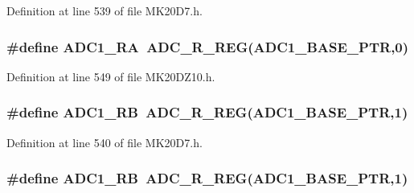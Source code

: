 Definition at line 539 of file M\+K20\+D7.\+h.

\subsubsection[{\texorpdfstring{A\+D\+C1\+\_\+\+RA}{ADC1_RA}}]{\setlength{\rightskip}{0pt plus 5cm}\#define A\+D\+C1\+\_\+\+RA~{\bf A\+D\+C\+\_\+\+R\+\_\+\+R\+EG}({\bf A\+D\+C1\+\_\+\+B\+A\+S\+E\+\_\+\+P\+TR},0)}\hypertarget{group___a_d_c___register___accessor___macros_ga1aaa28f242f4a1cfb93cceadfec24aba}{}\label{group___a_d_c___register___accessor___macros_ga1aaa28f242f4a1cfb93cceadfec24aba}


Definition at line 549 of file M\+K20\+D\+Z10.\+h.

\subsubsection[{\texorpdfstring{A\+D\+C1\+\_\+\+RB}{ADC1_RB}}]{\setlength{\rightskip}{0pt plus 5cm}\#define A\+D\+C1\+\_\+\+RB~{\bf A\+D\+C\+\_\+\+R\+\_\+\+R\+EG}({\bf A\+D\+C1\+\_\+\+B\+A\+S\+E\+\_\+\+P\+TR},1)}\hypertarget{group___a_d_c___register___accessor___macros_gafcfc11560da873f515eb1bf9d602e2b7}{}\label{group___a_d_c___register___accessor___macros_gafcfc11560da873f515eb1bf9d602e2b7}


Definition at line 540 of file M\+K20\+D7.\+h.

\subsubsection[{\texorpdfstring{A\+D\+C1\+\_\+\+RB}{ADC1_RB}}]{\setlength{\rightskip}{0pt plus 5cm}\#define A\+D\+C1\+\_\+\+RB~{\bf A\+D\+C\+\_\+\+R\+\_\+\+R\+EG}({\bf A\+D\+C1\+\_\+\+B\+A\+S\+E\+\_\+\+P\+TR},1)}\hypertarget{group___a_d_c___register___accessor___macros_gafcfc11560da873f515eb1bf9d602e2b7}{}\label{group___a_d_c___register___accessor___macros_gafcfc11560da873f515eb1bf9d602e2b7}


